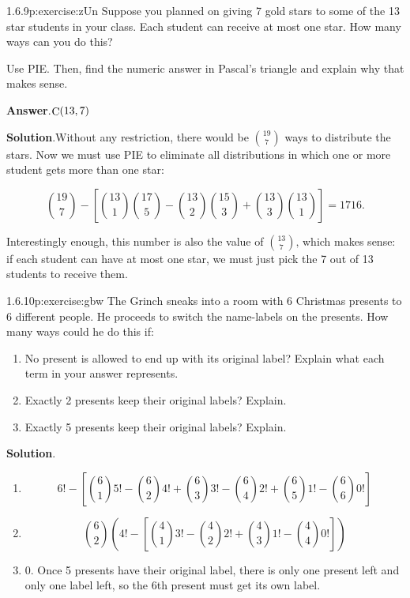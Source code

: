 \documentclass[twoside,11pt,]{book}
\newcommand{\blocktitlefont}{\relax}
\numberwithin{equation}{chapter}
\begin{document}
\begin{divisionsolution}{1.6.9}{}{p:exercise:zUn}%
Suppose you planned on giving 7 gold stars to some of the 13 star students in your class. Each student can receive at most one star. How many ways can you do this?%
\par
Use PIE. Then, find the numeric answer in Pascal's triangle and explain why that makes sense.%
\par\smallskip%
\noindent\textbf{\blocktitlefont Answer}.\quad{}\(\mathop{\rm C}\nolimits\!\left(13,7\right)\)%
\par\smallskip%
\noindent\textbf{\blocktitlefont Solution}.\quad{}Without any restriction, there would be \({19\choose 7}\) ways to distribute the stars. Now we must use PIE to eliminate all distributions in which one or more student gets more than one star:%
\par
%
\begin{equation*}
{19 \choose 7} - \left[{13 \choose 1}{17 \choose 5} - {13\choose 2}{15 \choose 3} + {13\choose 3}{13 \choose 1}\right] = 1716
\text{.}
\end{equation*}
%
\par
Interestingly enough, this number is also the value of \({13 \choose 7}\text{,}\) which makes sense: if each student can have at most one star, we must just pick the 7 out of 13 students to receive them.%
\end{divisionsolution}%
\begin{divisionsolution}{1.6.10}{}{p:exercise:gbw}%
The Grinch sneaks into a room with 6 Christmas presents to 6 different people. He proceeds to switch the name-labels on the presents. How many ways could he do this if:%
\begin{enumerate}[label=(\alph*)]
\item{}No present is allowed to end up with its original label? Explain what each term in your answer represents.%
\item{}Exactly 2 presents keep their original labels? Explain.%
\item{}Exactly 5 presents keep their original labels? Explain.%
\end{enumerate}
%
\par\smallskip%
\noindent\textbf{\blocktitlefont Solution}.\quad{}%
\begin{enumerate}[label=(\alph*)]
\item{}%
\begin{equation*}
6! - \left[{6 \choose 1}5! - {6 \choose 2}4! + {6 \choose 3}3! - {6 \choose 4}2! + {6 \choose 5}1! - {6 \choose 6}0!\right]
\end{equation*}
%
\item{}%
\begin{equation*}
{6 \choose 2}\left(4! - \left[{4\choose 1}3! - {4 \choose 2}2! + {4 \choose 3}1! - {4 \choose 4}0!\right]\right)
\end{equation*}
%
\item{}0. Once 5 presents have their original label, there is only one present left and only one label left, so the 6th present must get its own label.%
\end{enumerate}
%
\end{divisionsolution}%
\end{document}
